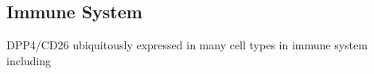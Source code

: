 \subsection{Immune System}
DPP4/CD26 ubiquitously expressed in many cell types in immune system including 
